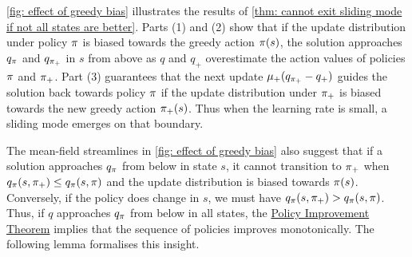 % 

% 






\autoref{fig: effect of greedy bias} illustrates the results of \autoref{thm: cannot exit sliding mode if not all states are better}.
Parts (1) and (2) show that if the update distribution under policy $\pi$ is biased towards the greedy action $\pi(s)$,
the solution approaches $q_\pi$ and $q_{\pi_+}$ in $s$ from above as $q$ and $q_+$ overestimate the action values of policies $\pi$ and $\pi_+$. Part (3) guarantees that the next update $\mu_+(q_{\pi_+} - q_+)$ guides the solution back towards policy $\pi$ if the update distribution under $\pi_+$ is biased towards the new greedy action $\pi_+(s)$. Thus when the learning rate is small, a sliding mode emerges on that boundary.


The mean-field streamlines in \autoref{fig: effect of greedy bias} also suggest that if a solution approaches $q_\pi$ from below in state $s$, it cannot transition to $\pi_+$ when $q_{\pi}(s, \pi_+) \leq q_{\pi}(s, \pi)$ and the update distribution is biased towards $\pi(s)$.
Conversely, if the policy does change in $s$, we must have $q_{\pi}(s, \pi_+) > q_{\pi}(s, \pi)$. Thus, if $q$ approaches $q_\pi$ from below in all states, the \hyperref[thm: policy improvement theorem]{Policy Improvement Theorem} implies that the sequence of policies improves monotonically.
The following lemma formalises this insight.




